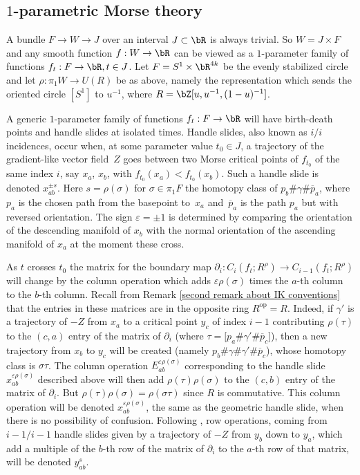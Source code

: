 \documentclass[JEP,XML,SOM,Unicode,NoFloatCountersInSection]{cedram}
\newcommand{\op}{\mathrm{op}}
\theoremstyle{plain}
\theoremstyle{definition}
\let\ve\varepsilon
\begin{document}
\subsection{$1$-parametric Morse theory}

A bundle $F\to W\to J$ over an interval $J\subset \bR$ is always trivial. So $W=J\times F$ and any smooth function $f:W\to\bR$ can be viewed as a $1$-parameter family of functions $f_t:F\to\bR, t\in J$. Let $F=S^1\times \bR^{4k}$ be the evenly stabilized circle and let $\rho:\pi_1W \to U(R)$ be as above, namely the representation which sends the oriented circle $[S^1]$ to $u^{-1}$, where $R=\bZ[u,u^{-1},(1-u)^{-1}]$.

A generic $1$-parameter family of functions $f_t:F\to \bR$ will have birth-death points and handle slides at isolated times. Handle slides, also known as $i/i$ incidences, occur when, at some parameter value $t_0 \in J$, a trajectory of the gradient-like vector field~$Z$ goes between two Morse critical points of $f_{t_0}$ of the same index $i$, say $x_a$, $x_b$, with $f_{t_0}(x_a)<f_{t_0}(x_b)$. Such a handle slide is denoted $x_{ab}^{\pm s}$. Here $s=\rho(\sigma)$ for $\sigma\in \pi_1 F$ the homotopy class of $p_b\# \gamma \# \overline {p}_a$, where $p_a$ is the chosen path from the basepoint to~$x_a$ and~$\overline{p}_a$ is the path $p_a$ but with reversed orientation. The sign $\ve=\pm 1$ is determined by comparing the orientation of the descending manifold of $x_b$ with the normal orientation of the ascending manifold of $x_a$ at the moment these cross.

As $t$ crosses $t_0$ the matrix for the boundary map $\partial_i:C_i(f_t;R^\rho)\to C_{i-1}(f_t;R^\rho)$ will change by the column operation which adds $\varepsilon \rho(\sigma)$ times the $a$-th column to the $b$-th column. Recall from Remark \ref{second remark about IK conventions} that the entries in these matrices are in the opposite ring $R^{\op}=R$. Indeed, if $\gamma'$ is a trajectory of $-Z$ from $x_a$ to a critical point $y_c$ of index $i-1$ contributing $\rho(\tau)$ to the $(c,a)$ entry of the matrix of $\partial_i$ (where $\tau=[p_a\# \gamma' \# \overline{p}_c$]), then a new trajectory from $x_b$ to $y_c$ will be created (namely $p_b\# \gamma\# \gamma' \# \overline{p}_c$), whose homotopy class is $\sigma\tau$. The column operation $E_{ab}^{\varepsilon \rho(\sigma)}$ corresponding to the handle slide~$x_{ab}^{\varepsilon\rho(\sigma)}$ described above will then add $\rho(\tau)\rho(\sigma)$ to the $(c,b)$ entry of the matrix of $\partial_i$. But $\rho(\tau)\rho(\sigma)=\rho(\sigma\tau)$ since $R$ is commutative. This column operation will be denoted $x_{ab}^{\varepsilon\rho(\sigma)}$, the same as the geometric handle slide, when there is no possibility of confusion. Following \cite{IK93}, row operations, coming from $i-1/i-1$ handle slides given by a trajectory of $-Z$ from $y_b$ down to $y_a$, which add a multiple of the $b$-th row of the matrix of $\partial_i$ to the $a$-th row of that matrix, will be denoted $y_{ab}^s$.
\end{document}
